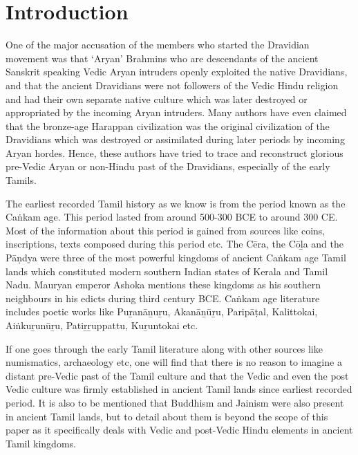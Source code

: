 \section*{Introduction}

One of the major accusation of the members who started the Dravidian movement was that ‘Aryan’ Brahmins who are descendants of the ancient Sanskrit speaking Vedic Aryan intruders openly exploited the native Dravidians, and that the ancient Dravidians were not followers of the Vedic Hindu religion and had their own separate native culture which was later destroyed or appropriated by the incoming Aryan intruders. Many authors have even claimed that the bronze-age Harappan civilization was the original civilization of the Dravidians which was destroyed or assimilated during later periods by incoming Aryan hordes. Hence, these authors have tried to trace and reconstruct glorious pre-Vedic Aryan or non-Hindu past of the Dravidians, especially of the early Tamils.

The earliest recorded Tamil history as we know is from the period known as the Caṅkam age. This period lasted from around 500-300 BCE to around 300 CE. Most of the information about this period is gained from sources like coins, inscriptions, texts composed during this period etc. The Cēra, the Cōḻa and the Pāṇdya were three of the most powerful kingdoms of ancient Caṅkam age Tamil lands which constituted modern southern Indian states of Kerala and Tamil Nadu. Mauryan emperor Ashoka mentions these kingdoms as his southern neighbours in his edicts during third century BCE. Caṅkam age literature includes poetic works like Puṟanāṉuṟu, Akanāṉūṟu, Paripāṭal, Kalittokai, Aiṅkuṟunūṟu, Patiṟṟuppattu, Kuṟuntokai etc.

If one goes through the early Tamil literature along with other sources like numismatics, archaeology etc, one will find that there is no reason to imagine a distant pre-Vedic past of the Tamil culture and that the Vedic and even the post Vedic culture was firmly established in ancient Tamil lands since earliest recorded period. It is also to be mentioned that Buddhism and Jainism were also present in ancient Tamil lands, but to detail about them is beyond the scope of this paper as it specifically deals with Vedic and post-Vedic Hindu elements in ancient Tamil kingdoms.


